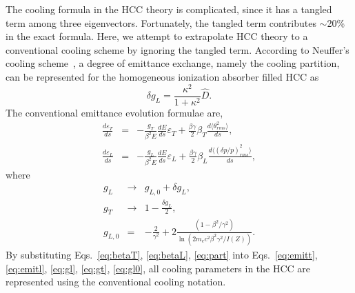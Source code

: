 \documentclass[11pt]{article}
\begin{document}
The cooling formula in the HCC theory is complicated, since it has a tangled term among three eigenvectors. 
Fortunately, the tangled term contributes $\sim$20\% in the exact formula. 
Here, we attempt to extrapolate HCC theory to a conventional cooling scheme by ignoring the tangled term. 
According to Neuffer's cooling scheme~\cite{Neuffer13}, a degree of emittance exchange, namely the cooling partition, can be represented for the homogeneous ionization absorber filled HCC as 
\begin{equation}
\delta g_{L} = \frac{\kappa^2}{1+\kappa^2}\hat{D}.
\label{eq:part}
\end{equation}
The conventional emittance evolution formulae are, 
\begin{eqnarray}
    \frac{d\varepsilon_T}{ds}&=&-\frac{g_T}{\beta^2 E}\frac{dE}{ds} \varepsilon_T 
    +\frac{\beta\gamma}{2}\beta_T\frac{d \langle \theta^2_{rms} \rangle}{ds}, \label{eq:emitt} \\
    \frac{d\varepsilon_L}{ds}&=&-\frac{g_L}{\beta^2 E}\frac{dE}{ds} \varepsilon_L 
    +\frac{\beta\gamma}{2}\beta_L\frac{d \langle \left( \delta p/p \right)^2_{rms}\rangle}{ds}, \label{eq:emitl}
\end{eqnarray}
where 
\begin{eqnarray}
    g_L &\rightarrow& g_{L,0}+\delta g_L, \label{eq:gl}\\
    g_T &\rightarrow& 1-\frac{\delta g_L}{2}, \label{eq:gt}\\
    g_{L,0}&=&-\frac{2}{\gamma^2}+2 \frac{\left( 1- \beta^2/\gamma^2 \right)}{\ln \left( 2 m_e c^2 \beta^2 \gamma^2/I (Z) \right)}. \label{eq:gl0}
\end{eqnarray}
By substituting Eqs.~\eqref{eq:betaT}, \eqref{eq:betaL}, \eqref{eq:part} into Eqs.~\eqref{eq:emitt}, \eqref{eq:emitl}, \eqref{eq:gl}, \eqref{eq:gt}, \eqref{eq:gl0}, all cooling parameters in the HCC
are represented using the conventional cooling notation. 
\end{document}
